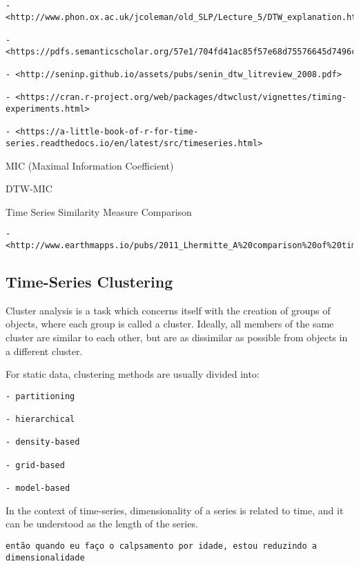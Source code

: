 \documentclass[
]{book}
\begin{document}
\begin{verbatim}
- <http://www.phon.ox.ac.uk/jcoleman/old_SLP/Lecture_5/DTW_explanation.html>

- <https://pdfs.semanticscholar.org/57e1/704fd41ac85f57e68d75576645d7496c4e55.pdf>

- <http://seninp.github.io/assets/pubs/senin_dtw_litreview_2008.pdf>

- <https://cran.r-project.org/web/packages/dtwclust/vignettes/timing-experiments.html>

- <https://a-little-book-of-r-for-time-series.readthedocs.io/en/latest/src/timeseries.html>
\end{verbatim}

MIC (Maximal Information Coefficient)

DTW-MIC

Time Series Similarity Measure Comparison

\begin{verbatim}
- <http://www.earthmapps.io/pubs/2011_Lhermitte_A%20comparison%20of%20time%20series.pdf>
\end{verbatim}

\hypertarget{time-series-clustering}{%
\subsection{Time-Series Clustering}\label{time-series-clustering}}

Cluster analysis is a task which concerns itself with the creation of groups of objects, where each group is called a cluster. Ideally, all members of the same cluster are similar to each other, but are as dissimilar as possible from objects in a different cluster.

For static data, clustering methods are usually divided into:

\begin{verbatim}
- partitioning

- hierarchical

- density-based

- grid-based

- model-based
\end{verbatim}

In the context of time-series, dimensionality of a series is related to time, and it can be understood as the length of the series.

\begin{verbatim}
então quando eu faço o calpsamento por idade, estou reduzindo a dimensionalidade
\end{verbatim}
\end{document}
